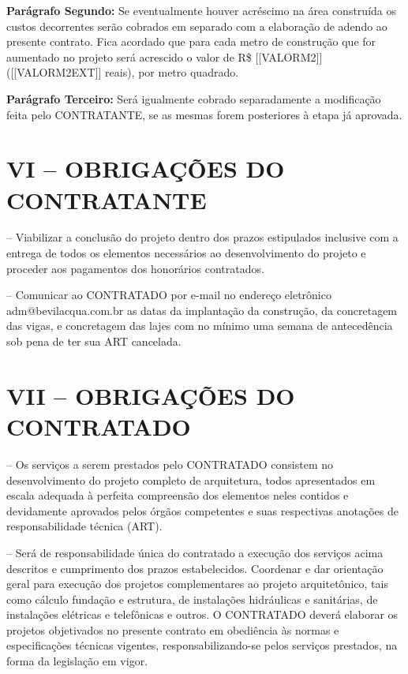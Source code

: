 \documentclass[11pt,a4paper]{article}
\begin{document}
\noindent\textbf{Parágrafo Segundo:} Se eventualmente houver acréscimo na área construída os custos decorrentes serão cobrados em separado com a elaboração de adendo ao presente contrato. Fica acordado que para cada metro de construção que for aumentado no projeto será acrescido o valor de R\$ [[VALORM2]] ([[VALORM2EXT]] reais), por metro quadrado.

\noindent\textbf{Parágrafo Terceiro:} Será igualmente cobrado separadamente a modificação feita pelo CONTRATANTE, se as mesmas forem posteriores à etapa já aprovada.

\section*{VI – OBRIGAÇÕES DO CONTRATANTE}

 – Viabilizar a conclusão do projeto dentro dos prazos estipulados inclusive com a entrega de todos os elementos necessários ao desenvolvimento do projeto e proceder aos pagamentos dos honorários contratados.

 – Comunicar ao CONTRATADO por e-mail no endereço eletrônico adm@bevilacqua.com.br as datas da implantação da construção, da concretagem das vigas, e concretagem das lajes com no mínimo uma semana de antecedência sob pena de ter sua ART cancelada.

\section*{VII – OBRIGAÇÕES DO CONTRATADO}

 – Os serviços a serem prestados pelo CONTRATADO consistem no desenvolvimento do projeto completo de arquitetura, todos apresentados em escala adequada à perfeita compreensão dos elementos neles contidos e devidamente aprovados pelos órgãos competentes e suas respectivas anotações de responsabilidade técnica (ART).

 – Será de responsabilidade única do contratado a execução dos serviços acima descritos e cumprimento dos prazos estabelecidos. Coordenar e dar orientação geral para execução dos projetos complementares ao projeto arquitetônico, tais como cálculo fundação e estrutura, de instalações hidráulicas e sanitárias, de instalações elétricas e telefônicas e outros. O CONTRATADO deverá elaborar os projetos objetivados no presente contrato em obediência às normas e especificações técnicas vigentes, responsabilizando-se pelos serviços prestados, na forma da legislação em vigor.
\end{document}
